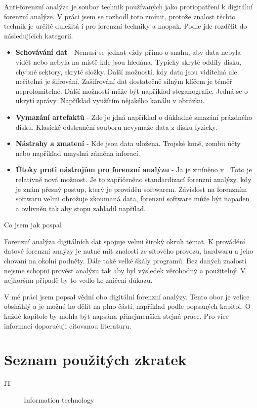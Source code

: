 \documentclass[thesis=B,czech]{FITthesis}[2012/06/26]
\begin{document}
Anti-forenzní analýza je soubor technik používaných jako protiopatření k digitální forenzní analýze. V práci jsem se rozhodl toto zmínit, protože znalost těchto technik je určitě duležitá i pro forenzní techniky a naopak. Podle \cite{anti-prezi} jde rozdělit do následujících kategorií.

\begin{itemize}

\item \textbf{Schovávání dat} - Nemusí se jednat vždy přímo o snahu, aby data nebyla viděť nebo nebyla na místě kde jsou hledána. Typicky skryté oddíly disku, chybné sektory, skryté složky. Další možností, kdy data jsou viditelná ale nečitelná je šifrování. Zašifrování dat dostatečně silným klíčem je téměř neprolomitelné. Dálší možností může být napřiklad steganografie. Jedná se o ukrytí zprávy. Například využítím nějakého kanálu v obrázku.
\item \textbf{Vymazání artefaktů} - Zde je jdná například o důkladné smazání prázdného disku. Klasické odstranění souboru nevymaže data z disku fyzicky. 
\item \textbf{Nástrahy a zmatení} - Kde jsou data uložena. Trojské koně, zombii účty nebo například umyslná záměna inforací. 
\item \textbf{Útoky proti nástrojům pro forenzní analýzu} - Ja je zmíněno v \cite{anti-prezi}. Toto je relativně nová možnost. Je to zapříčeněno standardizací forenzní analýzy, kdy je znám přesný postup, který je prováděn softwarem. Závislost na forenzním softwaru velmi ohrožuje zkoumaná data, forenzní software může být napaden a ovlivněn tak aby stopu zahladil napřílad. 

\end{itemize}



\begin{conclusion}
Co jsem jak pospal

Forenzní analýza digitálních dat spojuje velmi široký okruh témat. K provádění datové forenzní anaýzy je nutné mít znalosti ze sítového provozu, hardwaru a jeho chovaní na okolní podněty. Dále také velké škály programů. Bez daných znalostí nejsme schopni provést analýzu tak aby byl výsledek věrohodný a použitelný. V nejhorším případě by to vedlo ke zničení důkazů. 

V mé práci jsem popsal vědní obo digitální forenzní analýzy. Tento obor je velice obsháhlý a je možné ho dělit na plno částí, například podle popsaných kapitol. O každé kapitole by mohla být napsána přinejmenších stejná práce. Pro více informací doporučuji citovanou literaturu.






\end{conclusion}




\appendix

\chapter{Seznam použitých zkratek}
\begin{description}

    \item[IT] Information technology


\end{description}
\end{document}
